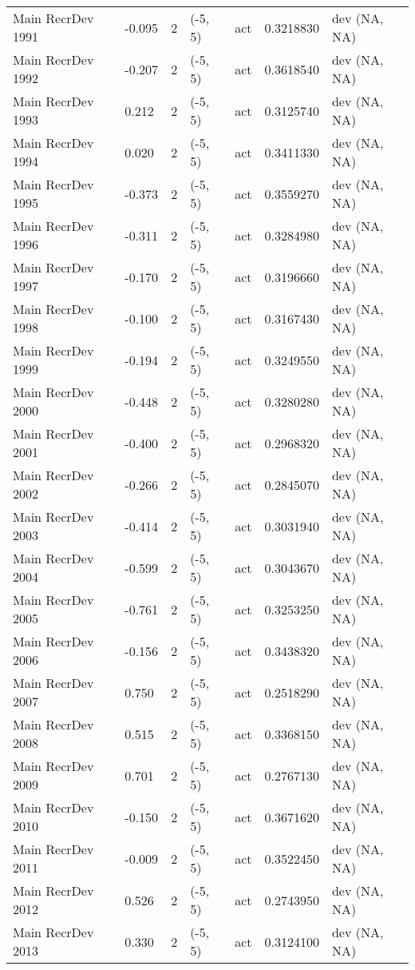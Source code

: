 \documentclass[11pt,
  english,
  letterpaper,
]{article}
\begin{document}
\begin{landscape}
\begin{longtable}[t]{>{\raggedright\arraybackslash}p{7cm}lllll>{\raggedright\arraybackslash}p{4cm}}
Main RecrDev 1991 & -0.095 & 2 & (-5, 5) & act & 0.3218830 & dev (NA, NA)\\
Main RecrDev 1992 & -0.207 & 2 & (-5, 5) & act & 0.3618540 & dev (NA, NA)\\
Main RecrDev 1993 & 0.212 & 2 & (-5, 5) & act & 0.3125740 & dev (NA, NA)\\
Main RecrDev 1994 & 0.020 & 2 & (-5, 5) & act & 0.3411330 & dev (NA, NA)\\
Main RecrDev 1995 & -0.373 & 2 & (-5, 5) & act & 0.3559270 & dev (NA, NA)\\
Main RecrDev 1996 & -0.311 & 2 & (-5, 5) & act & 0.3284980 & dev (NA, NA)\\
Main RecrDev 1997 & -0.170 & 2 & (-5, 5) & act & 0.3196660 & dev (NA, NA)\\
Main RecrDev 1998 & -0.100 & 2 & (-5, 5) & act & 0.3167430 & dev (NA, NA)\\
Main RecrDev 1999 & -0.194 & 2 & (-5, 5) & act & 0.3249550 & dev (NA, NA)\\
Main RecrDev 2000 & -0.448 & 2 & (-5, 5) & act & 0.3280280 & dev (NA, NA)\\
Main RecrDev 2001 & -0.400 & 2 & (-5, 5) & act & 0.2968320 & dev (NA, NA)\\
Main RecrDev 2002 & -0.266 & 2 & (-5, 5) & act & 0.2845070 & dev (NA, NA)\\
Main RecrDev 2003 & -0.414 & 2 & (-5, 5) & act & 0.3031940 & dev (NA, NA)\\
Main RecrDev 2004 & -0.599 & 2 & (-5, 5) & act & 0.3043670 & dev (NA, NA)\\
Main RecrDev 2005 & -0.761 & 2 & (-5, 5) & act & 0.3253250 & dev (NA, NA)\\
Main RecrDev 2006 & -0.156 & 2 & (-5, 5) & act & 0.3438320 & dev (NA, NA)\\
Main RecrDev 2007 & 0.750 & 2 & (-5, 5) & act & 0.2518290 & dev (NA, NA)\\
Main RecrDev 2008 & 0.515 & 2 & (-5, 5) & act & 0.3368150 & dev (NA, NA)\\
Main RecrDev 2009 & 0.701 & 2 & (-5, 5) & act & 0.2767130 & dev (NA, NA)\\
Main RecrDev 2010 & -0.150 & 2 & (-5, 5) & act & 0.3671620 & dev (NA, NA)\\
Main RecrDev 2011 & -0.009 & 2 & (-5, 5) & act & 0.3522450 & dev (NA, NA)\\
Main RecrDev 2012 & 0.526 & 2 & (-5, 5) & act & 0.2743950 & dev (NA, NA)\\
Main RecrDev 2013 & 0.330 & 2 & (-5, 5) & act & 0.3124100 & dev (NA, NA)\\

\end{longtable}
\end{landscape}
\end{document}
